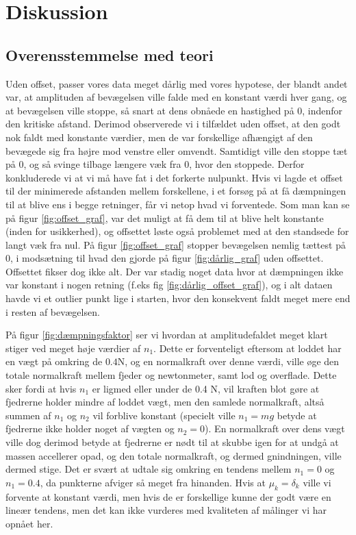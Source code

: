\chapter{Diskussion}
\section{Overensstemmelse med teori}
Uden offset, passer vores data meget dårlig med vores hypotese, der blandt andet var, 
at amplituden af bevægelsen ville falde med en konstant værdi hver gang, og at bevægelsen ville stoppe, 
så snart at dens obnåede en hastighed på 0, indenfor den kritiske afstand. 
Derimod observerede vi i tilfældet uden offset, at den godt nok faldt med konstante værdier, men de var forskellige afhængigt af den bevægede sig fra højre mod venstre eller omvendt.
Samtidigt ville den stoppe tæt på 0, og så svinge tilbage længere væk fra 0, hvor den stoppede. Derfor konkluderede vi at vi må have fat i det forkerte nulpunkt. 
Hvis vi lagde et offset til der minimerede afstanden mellem forskellene, i et forsøg på at få dæmpningen til at blive ens i begge retninger, får vi netop hvad vi forventede. 
Som man kan se på figur \ref{fig:offset_graf}, var det muligt at få dem til at blive helt konstante (inden for usikkerhed), og offsettet løste også problemet med at den standsede for langt væk fra nul. 
På figur \ref{fig:offset_graf} stopper bevægelsen nemlig tættest på 0, i modsætning til hvad den gjorde på figur \ref{fig:dårlig_graf} uden offsettet.
Offsettet fikser dog ikke alt. Der var stadig noget data hvor at dæmpningen ikke var konstant i nogen retning (f.eks fig \ref{fig:dårlig_offset_graf}), 
og i alt dataen havde vi et outlier punkt lige i starten, hvor den konsekvent faldt meget mere end i resten af bevægelsen.

På figur \ref{fig:dæmpningsfaktor} ser vi hvordan at amplitudefaldet meget klart stiger ved meget høje værdier af $n_1$. 
Dette er forventeligt eftersom at loddet har en vægt på omkring de $0.4$N, og en normalkraft over denne værdi, ville øge den totale normalkraft mellem fjeder og newtonmeter, samt lod og overflade.
Dette sker fordi at hvis $n_1$ er ligmed eller under de 0.4 N, vil kraften blot gøre at fjedrerne holder mindre af loddet vægt, men den samlede normalkraft, altså summen af $n_1$ og $n_2$ vil forblive konstant (specielt ville $n_1 = mg$ betyde at fjedrerne ikke holder noget af vægten og $n_2 = 0$). 
En normalkraft over dens vægt ville dog derimod betyde at fjedrerne er nødt til at skubbe igen for at undgå at massen accellerer opad, og den totale normalkraft, og dermed gnindningen, ville dermed stige.
Det er svært at udtale sig omkring en tendens mellem $n_1 = 0$ og $n_1 = 0.4$, da punkterne afviger så meget fra hinanden. Hvis at $\mu_k = \delta_k$ ville vi forvente at konstant værdi, men hvis de er forskellige kunne der godt være en lineær tendens, 
men det kan ikke vurderes med kvaliteten af målinger vi har opnået her. 
